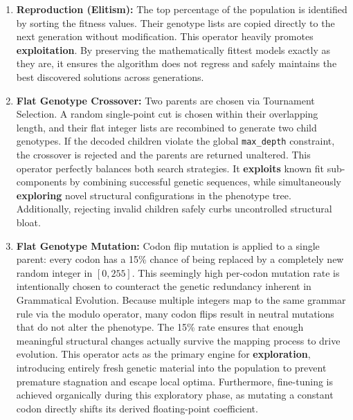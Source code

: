 \documentclass[12pt]{article}
\begin{document}
    \begin{enumerate}
        \item \textbf{Reproduction (Elitism):} 
        The top percentage of the population is identified by sorting the fitness values. Their genotype lists are copied directly to the next generation without modification. This operator heavily promotes \textbf{exploitation}. By preserving the mathematically fittest models exactly as they are, it ensures the algorithm does not regress and safely maintains the best discovered solutions across generations.
   
        \item \textbf{Flat Genotype Crossover:}
        Two parents are chosen via Tournament Selection. A random single-point cut is chosen within their overlapping length, and their flat integer lists are recombined to generate two child genotypes. If the decoded children violate the global \verb|max_depth| constraint, the crossover is rejected and the parents are returned unaltered. This operator perfectly balances both search strategies. It \textbf{exploits} known fit sub-components by combining successful genetic sequences, while simultaneously \textbf{exploring} novel structural configurations in the phenotype tree. Additionally, rejecting invalid children safely curbs uncontrolled structural bloat.
    
        \item \textbf{Flat Genotype Mutation:} 
        Codon flip mutation is applied to a single parent: every codon has a 15\% chance of being replaced by a completely new random integer in $[0, 255]$. This seemingly high per-codon mutation rate is intentionally chosen to counteract the genetic redundancy inherent in Grammatical Evolution. Because multiple integers map to the same grammar rule via the modulo operator, many codon flips result in neutral mutations that do not alter the phenotype. The 15\% rate ensures that enough meaningful structural changes actually survive the mapping process to drive evolution. This operator acts as the primary engine for \textbf{exploration}, introducing entirely fresh genetic material into the population to prevent premature stagnation and escape local optima. Furthermore, fine-tuning is achieved organically during this exploratory phase, as mutating a constant codon directly shifts its derived floating-point coefficient.
    \end{enumerate}
\end{document}
